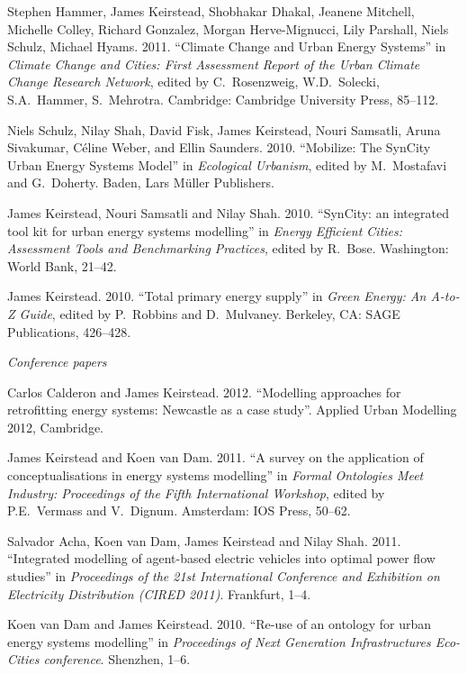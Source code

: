 \documentclass[11pt,a4paper]{article}
\begin{document}
\ind Stephen Hammer, James Keirstead, Shobhakar Dhakal, Jeanene Mitchell, Michelle Colley, Richard Gonzalez, Morgan Herve-Mignucci, Lily Parshall, Niels Schulz, Michael Hyams. 2011. ``Climate Change and Urban Energy Systems'' in \emph{Climate Change and Cities: First Assessment Report of the Urban Climate Change Research Network}, edited by C.\ Rosenzweig, W.D.\ Solecki, S.A.\ Hammer, S.\ Mehrotra.  Cambridge: Cambridge University Press, 85--112.

\ind Niels Schulz, Nilay Shah, David Fisk, James Keirstead, Nouri Samsatli, Aruna Sivakumar, C\'{e}line Weber, and Ellin Saunders. 2010. ``Mobilize: The SynCity Urban Energy Systems Model'' in \emph{Ecological Urbanism}, edited by M.\ Mostafavi and G.\ Doherty.  Baden, Lars M\"{u}ller Publishers.

\ind James Keirstead, Nouri Samsatli and Nilay Shah. 2010. ``SynCity: an integrated tool kit for urban energy systems modelling'' in \emph{Energy Efficient Cities: Assessment Tools and Benchmarking Practices}, edited by R.\ Bose.  Washington: World Bank, 21--42.

\ind James Keirstead. 2010. ``Total primary energy supply'' in \emph{Green Energy: An A-to-Z Guide}, edited by P.\ Robbins and D.\ Mulvaney.  Berkeley, CA: SAGE Publications, 426--428.


\bigskip 

\noindent\emph{Conference papers \vspace{0.01in}}

\ind Carlos Calderon and James Keirstead. 2012. ``Modelling approaches for retrofitting energy systems: Newcastle as a case study''.  Applied Urban Modelling 2012, Cambridge.

\ind James Keirstead and Koen van Dam. 2011. ``A survey on the application of conceptualisations in energy systems modelling'' in \emph{Formal Ontologies Meet Industry: Proceedings of the Fifth International Workshop}, edited by P.E.\ Vermass and V.\ Dignum.  Amsterdam: IOS Press, 50--62.

\ind Salvador Acha, Koen van Dam, James Keirstead and Nilay Shah. 2011. ``Integrated modelling of agent-based electric vehicles into optimal power flow studies'' in \emph{Proceedings of the 21st International Conference and Exhibition on Electricity Distribution (CIRED 2011)}.  Frankfurt, 1--4.

\ind Koen van Dam and James Keirstead. 2010. ``Re-use of an ontology for urban energy systems modelling'' in \emph{Proceedings of Next Generation Infrastructures Eco-Cities conference}.  Shenzhen, 1--6.
\end{document}
